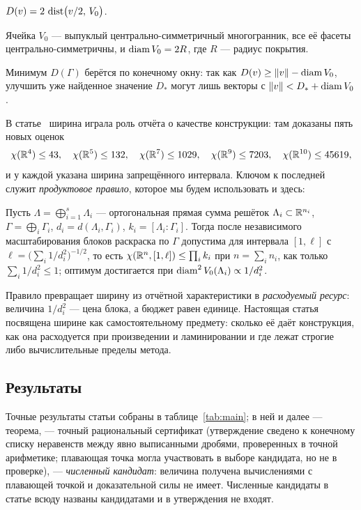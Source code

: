 \begin{lemma}\label{lem:mid}
$D(v)=2\,\operatorname{dist}\bigl(v/2,\,V_0\bigr)$.
\end{lemma}

\begin{lemma}[Вороной]\label{lem:sym}
Ячейка $V_0$ --- выпуклый центрально-симметричный многогранник, все её фасеты
центрально-симметричны, и $\operatorname{diam} V_0=2R$, где $R$ --- радиус покрытия.
\end{lemma}

Минимум $D(\Gamma)$ берётся по конечному окну: так как
$D(v)\ge\|v\|-\operatorname{diam} V_0$, улучшить уже найденное значение $D_*$ могут лишь
векторы с $\|v\|<D_*+\operatorname{diam} V_0$.

В статье~\cite{Bounds} ширина играла роль отчёта о качестве конструкции: там
доказаны пять новых оценок
\[
\chi(\mathbb{R}^4)\le43,\quad\chi(\mathbb{R}^5)\le132,\quad\chi(\mathbb{R}^7)\le1029,\quad
\chi(\mathbb{R}^9)\le7203,\quad\chi(\mathbb{R}^{10})\le45619,
\]
и у каждой указана ширина запрещённого интервала. Ключом к последней
служит \emph{продуктовое правило}, которое мы будем использовать и здесь:

\begin{proposition}
\label{prop:product}
Пусть $\Lambda=\bigoplus_{i=1}^{s}\Lambda_i$ --- ортогональная прямая сумма
решёток $\Lambda_i\subset\mathbb{R}^{n_i}$, $\Gamma=\bigoplus_i\Gamma_i$,
$d_i=d(\Lambda_i,\Gamma_i)$, $k_i=[\Lambda_i:\Gamma_i]$. Тогда после
независимого масштабирования блоков раскраска по $\Gamma$ допустима для
интервала $[1,\ell]$ с $\ell=\bigl(\sum_i 1/d_i^2\bigr)^{-1/2}$, то есть
$\chi(\mathbb{R}^n,[1,\ell])\le\prod_i k_i$ при $n=\sum_i n_i$, как только
$\sum_i 1/d_i^2\le1$; оптимум достигается при $\operatorname{diam}^2V_0(\Lambda_i)\propto1/d_i^2$.
\end{proposition}

Правило превращает ширину из отчётной характеристики в \emph{расходуемый
ресурс}: величина $1/d_i^2$ --- цена блока, а бюджет равен единице. Настоящая
статья посвящена ширине как самостоятельному предмету: сколько её даёт
конструкция, как она расходуется при произведении и ламинировании и где лежат
строгие либо вычислительные пределы метода.

\subsection{Результаты}

Точные результаты статьи собраны в таблице~\ref{tab:main}; в ней и далее
\stP{} --- теорема, \stC{} --- точный рациональный сертификат (утверждение
сведено к конечному списку неравенств между явно выписанными дробями,
проверенных в точной арифметике; плавающая точка могла участвовать в выборе
кандидата, но не в проверке), \stN{} --- \emph{численный кандидат}: величина
получена вычислениями с плавающей точкой и доказательной силы не имеет.
Численные кандидаты в статье всюду названы кандидатами и в утверждения не
входят.

